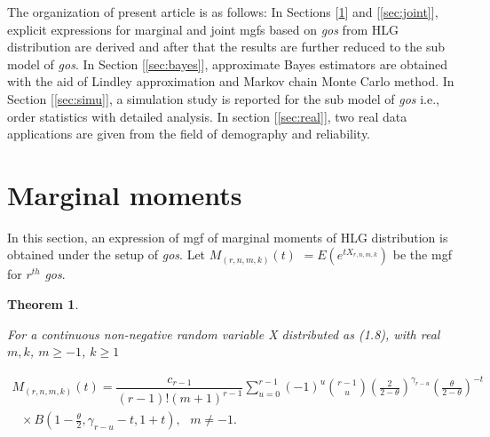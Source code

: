 \documentclass[11pt,a4paper]{article}
\numberwithin{equation}{section}
\newtheorem{theorem}{Theorem}[section]
\begin{document}
	The organization of present article is as follows: In Sections [\ref{sec2}] and [\ref{sec:joint}], explicit expressions for marginal and joint mgfs based on \textit{gos} from HLG distribution are derived and after that the results are further reduced to the sub model of \textit{gos}. In Section [\ref{sec:bayes}], approximate Bayes estimators are obtained with the aid of Lindley approximation and Markov chain Monte Carlo method. In Section [\ref{sec:simu}], a simulation study is reported for the sub model of \textit{gos} i.e., order statistics with detailed analysis. In section [\ref{sec:real}], two real data applications are given from the field of demography and reliability. 

	

\section{Marginal moments}\label{sec2}

	In this section, an expression of mgf of marginal moments of HLG distribution is obtained under the setup of \textit{gos}. Let $M_{(r,n,m,k)}(t)$ $=E(e^{tX_{r,n,m,k}})$ be the mgf for $r^{th}$ \textit{gos}.

	\begin{theorem}\label{theo1}

		For a continuous non-negative random variable X distributed as (1.8), with real $m,k$,  $m\ge-1$, $k\ge1$ 

	\end{theorem}

	\begin{eqnarray} \label{mgf.gos}

		M_{(r,n,m,k)}(t)=\dfrac{c_{r-1}}{(r-1)!(m+1)^{r-1}}\sum_{u=0}^{r-1}(-1)^{u}\binom{r-1}{u}\left(\frac{2}{2-\theta}\right)^{\gamma_{r-u}}\left(\frac{\theta}{2-\theta}\right)^{-t} \nonumber\\

		\, \, \, \, \times B\left(1-\frac{\theta}{2},\gamma_{r-u}-t,1+t\right),\,\,\,\,m\ne-1.\,\,\,\,\,\,\,\,

	\end{eqnarray}
\end{document}
